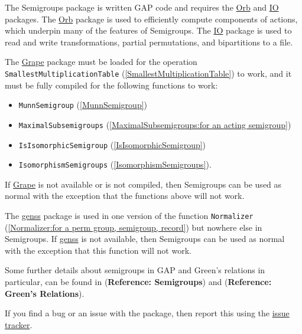 \documentclass[a4paper,11pt]{report}
\begin{document}
{{ The \textsf{Semigroups} package is written \textsf{GAP} code and requires the \href{ http://www-groups.mcs.st-and.ac.uk/~neunhoef/Computer/Software/Gap/orb.html } {Orb} and \href{ http://www-groups.mcs.st-and.ac.uk/~neunhoef/Computer/Software/Gap/io.html } {IO} packages. The \href{ http://www-groups.mcs.st-and.ac.uk/~neunhoef/Computer/Software/Gap/orb.html } {Orb} package is used to efficiently compute components of actions, which underpin
many of the features of \textsf{Semigroups}. The \href{ http://www-groups.mcs.st-and.ac.uk/~neunhoef/Computer/Software/Gap/io.html } {IO} package is used to read and write transformations, partial permutations, and
bipartitions to a file. 

 The \href{http://www.maths.qmul.ac.uk/~leonard/grape/} {Grape} package must be loaded for the operation \texttt{SmallestMultiplicationTable} (\ref{SmallestMultiplicationTable}) to work, and it must be fully compiled for the following functions to work: 
\begin{itemize}
\item  \texttt{MunnSemigroup} (\ref{MunnSemigroup}) 
\item  \texttt{MaximalSubsemigroups} (\ref{MaximalSubsemigroups:for an acting semigroup}) 
\item  \texttt{IsIsomorphicSemigroup} (\ref{IsIsomorphicSemigroup}) 
\item  \texttt{IsomorphismSemigroups} (\ref{IsomorphismSemigroups}). 
\end{itemize}
 If \href{http://www.maths.qmul.ac.uk/~leonard/grape/} {Grape} is not available or is not compiled, then \textsf{Semigroups} can be used as normal with the exception that the functions above will not
work. 

 The \href{ http://www-groups.mcs.st-and.ac.uk/~neunhoef/Computer/Software/Gap/genss.html } {genss} package is used in one version of the function \texttt{Normalizer} (\ref{Normalizer:for a perm group, semigroup, record}) but nowhere else in \textsf{Semigroups}. If \href{ http://www-groups.mcs.st-and.ac.uk/~neunhoef/Computer/Software/Gap/genss.html } {genss} is not available, then \textsf{Semigroups} can be used as normal with the exception that this function will not work. 

 Some further details about semigroups in \textsf{GAP} and Green's relations in particular, can be found in  (\textbf{Reference: Semigroups}) and  (\textbf{Reference: Green's Relations}).

 If you find a bug or an issue with the package, then report this using the \href{http://bitbucket.org/james-d-mitchell/semigroups/issues} {issue tracker}. }

}
\end{document}
